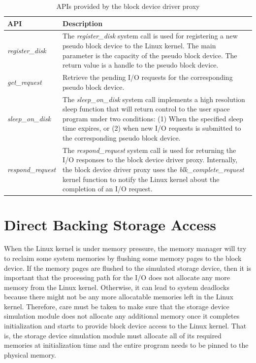 \begin{table}[htpb]%
	\renewcommand{\arraystretch}{1.3}
	\centering
	\caption{APIs provided by the block device driver proxy}\label{tab:II}
	\noindent\begin{tabularx}{\textwidth}{|p{3.5cm}|X|}
	\hline
	\centering\bfseries API & \centering\bfseries\arraybackslash Description \\ \hline
	\textit{register_disk} & The \textit{register_disk} system call is used for registering a new pseudo block device to the Linux kernel. The main parameter is the capacity of the pseudo block device. The return value is a handle to the pseudo block device. \\ \hline
	
	\textit{get_request} & Retrieve the pending I/O requests for the corresponding pseudo block device. \\ \hline
	
	\textit{sleep_on_disk} & The \textit{sleep_on_disk} system call implements a high resolution sleep function that will return control to the user space program under two conditions: (1) When the specified sleep time expires, or (2) when new I/O requests is submitted to the corresponding pseudo block device. \\ \hline
	
	\textit{respond_request} & The \textit{respond_request} system call is used for returning the I/O responses to the block device driver proxy. Internally, the block device driver proxy uses the \textit{blk_complete_request} kernel function to notify the Linux kernel about the completion of an I/O request. \\ \hline
	\end{tabularx}
\end{table}


\section{Direct Backing Storage Access}
\label{sec:direct-backing-storage}

When the Linux kernel is under memory pressure, the memory manager will try to reclaim some system memories by flushing some memory pages to the block device. If the memory pages are flushed to the simulated storage device, then it is important that the processing path for the I/O does not allocate any more memory from the Linux kernel. Otherwise, it can lead to system deadlocks because there might not be any more allocatable memories left in the Linux kernel. Therefore, care must be taken to make sure that the storage device simulation module does not allocate any additional memory once it completes initialization and starts to provide block device access to the Linux kernel. That is, the storage device simulation module must allocate all of its required memories at initialization time and the entire program needs to be pinned to the physical memory.

